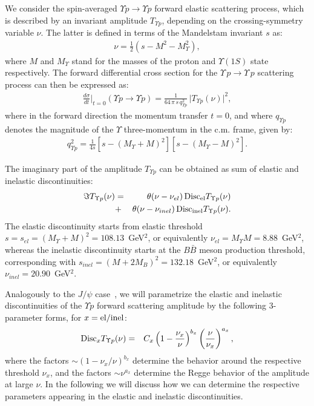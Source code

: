 \documentclass[prd,amsmath,%
twocolumn,floatfix,amssymb, preprintnumbers, nofootinbib, superscriptaddress]{revtex4}
\newcommand{\bea}{\begin{eqnarray}}
\newcommand{\eea}{\end{eqnarray}}
\begin{document}
We consider the spin-averaged $\Upsilon p \to \Upsilon p$ forward elastic scattering process, which is described by an invariant amplitude $T_{\Upsilon p}$, depending on the crossing-symmetry variable $\nu$. The latter is defined in terms of the Mandelstam invariant $s$ as:
\bea
\nu = \frac{1}{2} (s - M^2 - M_\Upsilon^2),
\eea
where $M$ and $M_\Upsilon$ stand for the masses of the proton and $\Upsilon(1S)$ state respectively.  
The forward differential cross section for the $\Upsilon \, p \to \Upsilon \, p$ scattering process can then be expressed as:
\bea
\frac{d \sigma}{dt} \biggr|_{t = 0} (\Upsilon p \to \Upsilon p) = \frac{1}{64 \, \pi \, s \, q_{\Upsilon p}^2} \, \big| T_{\Upsilon p}(\nu) \big|^2,
\eea
where in the forward direction the momentum transfer $t = 0$, and where $q_{\Upsilon p}$ denotes the magnitude of the $\Upsilon$ three-momentum in the c.m. frame, given by:
 \bea 
 q_{\Upsilon p}^2  = \frac{1}{4 s} \left[ s - (M_\Upsilon + M)^2 \right] \left[ s - (M_\Upsilon - M)^2 \right].
 \eea 
 
The imaginary part of the amplitude $T_{\Upsilon p}$ can be obtained as sum of elastic and inelastic discontinuities:
\bea
\Im T_{\Upsilon p}(\nu)  &=& \theta(\nu - \nu_{el}) \,  {\rm Disc}_{\rm el} T_{\Upsilon p}(\nu) \nonumber \\
&+&   \theta(\nu - \nu_{inel}) \,  {\rm Disc}_{\rm inel} T_{\Upsilon p}(\nu).
\label{eq:disctot}
\eea
The elastic discontinuity starts from elastic threshold $s = s_{el} = (M_\Upsilon + M)^2 = 108.13$~GeV$^2$, or equivalently $\nu_{el} = M_\Upsilon M = 8.88$~GeV$^2$, whereas the inelastic discontinuity starts at the $B \bar B$ meson production threshold, corresponding with $s_{inel} = (M + 2 M_B)^2 = 132.18$~GeV$^2$, or equivalently $\nu_{inel} = 20.90$~GeV$^2$. 

Analogously to the $J/\psi$ case~\cite{Gryniuk:2016mpk}, we will parametrize the elastic and inelastic discontinuities of the $\Upsilon p$  forward scattering amplitude by the following 3-parameter forms, for $x = {\rm el/inel}$:
\bea
{\rm Disc}_{x} T_{\Upsilon p}(\nu)  &=& 
C_{x} \left( 1 - \frac{\nu_{x}}{\nu} \right)^{b_{x}}  \left( \frac{\nu}{\nu_{x}} \right)^{a_{x}} ,
\label{eq:discx} 
\eea
where the factors $\sim (1 - \nu_x / \nu)^{b_x}$  
determine the behavior around the respective threshold $\nu_x$, and the 
factors  $\sim \nu^{a_x}$ determine the Regge behavior of the amplitude at large $\nu$. 
In the following we will discuss how we can determine the respective parameters 
appearing in the elastic and inelastic discontinuities. 
\end{document}
